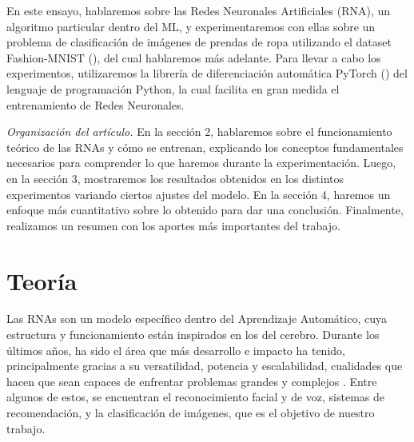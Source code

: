 \documentclass[aps,twocolumn,groupedaddress]{revtex4-2}
\begin{document}
En este ensayo, hablaremos sobre las Redes Neuronales Artificiales (RNA), un algoritmo particular dentro del ML, y experimentaremos con ellas sobre un problema de clasificación de imágenes de prendas de ropa utilizando el dataset Fashion-MNIST (\cite{fashion-mnist}), del cual hablaremos más adelante.  Para llevar a cabo los experimentos, utilizaremos la librería de diferenciación automática PyTorch (\cite{pytorch}) del lenguaje de programación Python, la cual facilita en gran medida el entrenamiento de Redes Neuronales.

\textit{Organización del artículo.} En la sección 2, hablaremos sobre el funcionamiento teórico de las RNAs y cómo se entrenan, explicando los conceptos fundamentales necesarios para comprender lo que haremos durante la experimentación. Luego, en la sección 3, mostraremos los resultados obtenidos en los distintos experimentos variando ciertos ajustes del modelo. En la sección 4, haremos un enfoque más cuantitativo sobre lo obtenido para dar una conclusión. Finalmente, realizamos un resumen con los aportes más importantes del trabajo.

\section{Teor\'ia}
Las RNAs son un modelo específico dentro del Aprendizaje Automático, cuya estructura y funcionamiento están inspirados en los del cerebro. Durante los últimos años, ha sido el área que más desarrollo e impacto ha tenido, principalmente gracias a su versatilidad, potencia y escalabilidad, cualidades que hacen que sean capaces de enfrentar problemas grandes y complejos \cite{hands-on-ML-sklearn-tf}. Entre algunos de estos, se encuentran el reconocimiento facial y de voz, sistemas de recomendación, y la clasificación de imágenes, que es el objetivo de nuestro trabajo. 
\end{document}
